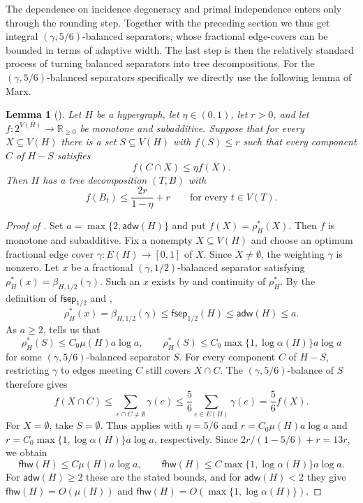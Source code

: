 \documentclass[11pt,letterpaper]{article}
\newtheorem{lemma}[lemma]{Lemma}
\theoremstyle{definition}
\theoremstyle{remark}
\newcommand{\R}{\mathbb R}
\newcommand{\fhw}{\mathsf{fhw}}
\newcommand{\adw}{\mathsf{adw}}
\newcommand{\fsep}{\mathsf{fsep}}
\providecommand{\adw}{\operatorname{adw}}
\providecommand{\fhw}{\operatorname{fhw}}
\begin{document}
The dependence on incidence degeneracy and primal independence enters only through the rounding step. Together with the preceding section we thus get integral $(\gamma,5/6)$-balanced separators, whose fractional edge-covers can be bounded in terms of adaptive width. The last step is then the relatively standard process of turning balanced separators into tree decompositions. For the $(\gamma,5/6)$-balanced separators specifically we directly use the following lemma of Marx.

\begin{lemma}[{\cite[Section~5.2]{adw}}]
\label{lem:recursive-decomposition}
Let $H$ be a hypergraph, let $\eta\in(0,1)$, let $r>0$, and let
$f:2^{V(H)}\to\R_{\ge0}$ be monotone and subadditive.
Suppose that for every $X\subseteq V(H)$ there is a set $S\subseteq V(H)$
with $f(S)\le r$ such that every component $C$ of $H-S$ satisfies
\[
 f(C\cap X)\le\eta f(X).
\]
Then $H$ has a tree decomposition $(T,B)$ with
\[
 f(B_t)\le\frac{2r}{1-\eta}+r
 \qquad\text{for every }t\in V(T).
\]
\end{lemma}

\mainwidththeorem*

\begin{proof}[Proof of ]
Set $a=\max\{2,\adw(H)\}$ and put $f(X)=\rho_H^*(X)$.
Then $f$ is monotone and subadditive. Fix a nonempty $X\subseteq V(H)$
and choose an optimum fractional edge cover $\gamma:E(H)\to[0,1]$ of $X$.
Since $X\ne\emptyset$, the weighting $\gamma$ is nonzero. Let $x$ be a
fractional $(\gamma,1/2)$-balanced separator satisfying
\(
 \rho_H^*(x)=\beta_{H,1/2}(\gamma).
\)
Such an $x$ exists by  and
continuity of $\rho_H^*$. By the definition of $\fsep_{1/2}$ and
,
\[
 \rho_H^*(x)
 =\beta_{H,1/2}(\gamma)
 \le\fsep_{1/2}(H)
 \le\adw(H)
 \le a.
\]
As $a\ge2$,  tells us that
\[
 \rho_H^*(S)\le C_0\mu(H)a\log a,
 \qquad
 \rho_H^*(S)\le C_0\max\{1,\log\alpha(H)\}a\log a
\]
for some $(\gamma,5/6)$-balanced separator $S$.
For every component $C$ of $H-S$, restricting $\gamma$ to edges meeting
$C$ still covers $X\cap C$. The $(\gamma,5/6)$-balance of $S$ therefore gives
\[
 f(X\cap C)
 \le\sum_{e\cap C\ne\emptyset}\gamma(e)
 \le\frac56\sum_{e\in E(H)}\gamma(e)
 =\frac56 f(X).
\]
For $X=\emptyset$, take $S=\emptyset$.
Thus  applies with $\eta=5/6$ and
$r=C_0\mu(H)a\log a$ and $r=C_0\max\{1,\log\alpha(H)\}a\log a$, respectively.
Since $2r/(1-5/6)+r=13r$, we obtain
\[
 \fhw(H)\le C\mu(H)a\log a,
 \qquad
 \fhw(H)\le C\max\{1,\log\alpha(H)\}a\log a.
\]
For $\adw(H)\ge2$ these are the stated bounds,
and for $\adw(H)<2$ they give $\fhw(H)=O(\mu(H))$ and $\fhw(H)=O(\max\{1,\log\alpha(H)\})$.
\end{proof}
\end{document}
